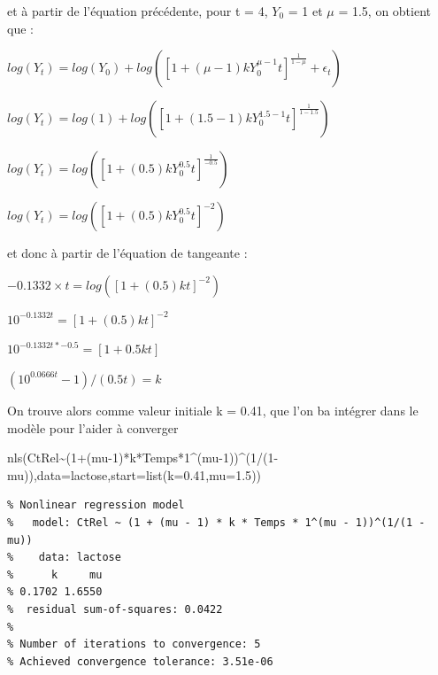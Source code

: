 \documentclass[
]{article}
\newenvironment{Shaded}{\begin{snugshade}}{\end{snugshade}}
\newcommand{\AttributeTok}[1]{\textcolor[rgb]{0.77,0.63,0.00}{#1}}
\newcommand{\DecValTok}[1]{\textcolor[rgb]{0.00,0.00,0.81}{#1}}
\newcommand{\FloatTok}[1]{\textcolor[rgb]{0.00,0.00,0.81}{#1}}
\newcommand{\FunctionTok}[1]{\textcolor[rgb]{0.00,0.00,0.00}{#1}}
\newcommand{\NormalTok}[1]{#1}
\newcommand{\SpecialCharTok}[1]{\textcolor[rgb]{0.00,0.00,0.00}{#1}}
\begin{document}
et à partir de l'équation précédente, pour t = 4, \(Y_0\) = 1 et \(\mu\)
= 1.5, on obtient que :

\begin{center}
$log(Y_{t})=log(Y_{0})+log([1+( \mu-1)kY_{0}^{\mu-1}t]^{\frac{1}{1- \mu}}+ \epsilon_{t})$

$log(Y_{t})=log(1)+log([1+(1.5-1)kY_{0}^{1.5-1}t]^{\frac{1}{1- 1.5}})$

$log(Y_{t})=log([1+(0.5)kY_{0}^{0.5}t]^{\frac{1}{-0.5}})$

$log(Y_{t})=log([1+(0.5)kY_{0}^{0.5}t]^{-2})$
\end{center}

et donc à partir de l'équation de tangeante :

\begin{center}
$-0.1332 \times t = log([1+(0.5)kt]^{-2})$

$10^{-0.1332t}= [1+(0.5)k t]^{-2}$

$10^{-0.1332t*-0.5}= [1+0.5kt]$

$(10^{0.0666t}-1)/(0.5t)= k$
\end{center}

On trouve alors comme valeur initiale k = 0.41, que l'on ba intégrer
dans le modèle pour l'aider à converger

\begin{Shaded}
\begin{Highlighting}[]
\FunctionTok{nls}\NormalTok{(CtRel}\SpecialCharTok{\textasciitilde{}}\NormalTok{(}\DecValTok{1}\SpecialCharTok{+}\NormalTok{(mu}\DecValTok{{-}1}\NormalTok{)}\SpecialCharTok{*}\NormalTok{k}\SpecialCharTok{*}\NormalTok{Temps}\SpecialCharTok{*}\DecValTok{1}\SpecialCharTok{\^{}}\NormalTok{(mu}\DecValTok{{-}1}\NormalTok{))}\SpecialCharTok{\^{}}\NormalTok{(}\DecValTok{1}\SpecialCharTok{/}\NormalTok{(}\DecValTok{1}\SpecialCharTok{{-}}\NormalTok{mu)),}\AttributeTok{data=}\NormalTok{lactose,}\AttributeTok{start=}\FunctionTok{list}\NormalTok{(}\AttributeTok{k=}\FloatTok{0.41}\NormalTok{,}\AttributeTok{mu=}\FloatTok{1.5}\NormalTok{))}
\end{Highlighting}
\end{Shaded}

\begin{verbatim}
% Nonlinear regression model
%   model: CtRel ~ (1 + (mu - 1) * k * Temps * 1^(mu - 1))^(1/(1 - mu))
%    data: lactose
%      k     mu 
% 0.1702 1.6550 
%  residual sum-of-squares: 0.0422
% 
% Number of iterations to convergence: 5 
% Achieved convergence tolerance: 3.51e-06
\end{verbatim}
\end{document}
